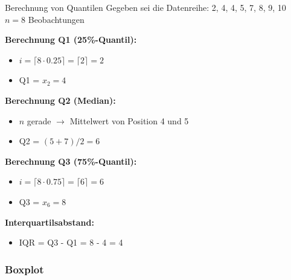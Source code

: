 \begin{example2}{Berechnung von Quantilen}
Gegeben sei die Datenreihe: 2, 4, 4, 5, 7, 8, 9, 10\\
$n = 8$ Beobachtungen

\textbf{Berechnung Q1 (25\%-Quantil):}
\begin{itemize}
    \item $i = \lceil 8 \cdot 0.25 \rceil = \lceil 2 \rceil = 2$
    \item Q1 = $x_2 = 4$
\end{itemize}

\textbf{Berechnung Q2 (Median):}
\begin{itemize}
    \item $n$ gerade $\rightarrow$ Mittelwert von Position 4 und 5
    \item Q2 = $(5 + 7)/2 = 6$
\end{itemize}

\textbf{Berechnung Q3 (75\%-Quantil):}
\begin{itemize}
    \item $i = \lceil 8 \cdot 0.75 \rceil = \lceil 6 \rceil = 6$
    \item Q3 = $x_6 = 8$
\end{itemize}

\textbf{Interquartilsabstand:}
\begin{itemize}
    \item IQR = Q3 - Q1 = 8 - 4 = 4
\end{itemize}
\end{example2}

\subsubsection{Boxplot}

